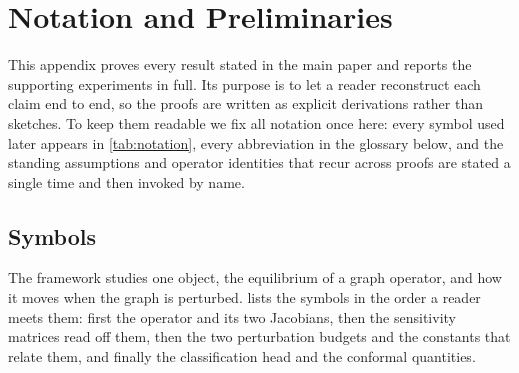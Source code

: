 \section{Notation and Preliminaries}
\label{app:prelim}

This appendix proves every result stated in the main paper and reports the supporting experiments in
full. Its purpose is to let a reader reconstruct each claim end to end, so the proofs are written as
explicit derivations rather than sketches. To keep them readable we fix all notation once here: every
symbol used later appears in \cref{tab:notation}, every abbreviation in the glossary below, and the
standing assumptions and operator identities that recur across proofs are stated a single time and then
invoked by name.

\subsection{Symbols}
\label{app:symbols}

The framework studies one object, the equilibrium of a graph operator, and how it moves when the graph
is perturbed.  lists the symbols in the order a reader meets them: first the operator
and its two Jacobians, then the sensitivity matrices read off them, then the two perturbation budgets
and the constants that relate them, and finally the classification head and the conformal quantities.

